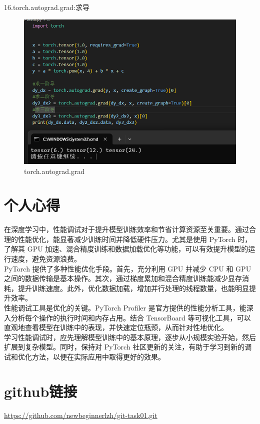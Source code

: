 \documentclass[a4paper, 12pt]{article}
\begin{document}
16.torch.autograd.grad:求导
\begin{figure}[H]
  \centering
  \includegraphics[width=\textwidth]{屏幕截图 2024-09-15 110908.png}
  \caption{torch.autograd.grad}
\end{figure}




\section{个人心得}

在深度学习中，性能调试对于提升模型训练效率和节省计算资源至关重要。通过合理的性能优化，能显著减少训练时间并降低硬件压力。尤其是使用 PyTorch 时，了解其 GPU 加速、混合精度训练和数据加载优化等功能，可以有效提升模型的运行速度，避免资源浪费。
\\
\indent PyTorch 提供了多种性能优化手段。首先，充分利用 GPU 并减少 CPU 和 GPU 之间的数据传输是基本操作。其次，通过梯度累加和混合精度训练能减少显存消耗，提升训练速度。此外，优化数据加载，增加并行处理的线程数量，也能明显提升效率。
\\
\indent 性能调试工具是优化的关键。PyTorch Profiler 是官方提供的性能分析工具，能深入分析每个操作的执行时间和内存占用。结合 TensorBoard 等可视化工具，可以直观地查看模型在训练中的表现，并快速定位瓶颈，从而针对性地优化。
\\
\indent 学习性能调试时，应先理解模型训练中的基本原理，逐步从小规模实验开始，然后扩展到复杂模型。同时，保持对 PyTorch 社区更新的关注，有助于学习到新的调试和优化方法，以便在实际应用中取得更好的效果。

\section{github链接}

\href{https://github.com/newbeginnerlzh/git-task01.git}{\color{red}https://github.com/newbeginnerlzh/git-task01.git}
\end{document}

